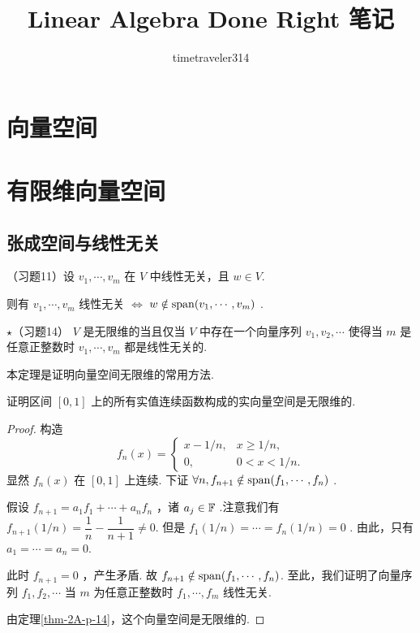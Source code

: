 \documentclass[cn,hazy,blue,14pt,screen]{elegantnote}
\title{Linear Algebra Done Right 笔记}
\author{timetraveler314}
\institute{PigeonCrowd}
\date{\zhtoday}
\begin{document}
\maketitle

\section{向量空间}

\section{有限维向量空间}

\subsection{张成空间与线性无关}

\begin{theorem}
    \label{thm-2A-p-11}
    （习题11）设 $v_1, \cdots , v_m$ 在 $V$ 中线性无关，且 $w\in V$.

    则有 $v_1,\cdots,v_m$ 线性无关 $\iff$ $w\notin \operatorname{span}(v_1,\cdots,v_m)$ .
\end{theorem}

\begin{theorem}
    \label{thm-2A-p-14}
    $\star$（习题14） $V$ 是无限维的当且仅当 $V$ 中存在一个向量序列 $v_1,v_2,\cdots$ 使得当 $m$ 是任意正整数时 $v_1,\cdots, v_m$ 都是线性无关的.
\end{theorem}

\begin{note}
    本定理是证明向量空间无限维的常用方法.
\end{note}

\Sep

\begin{problem}
    证明区间 $[0,1]$ 上的所有实值连续函数构成的实向量空间是无限维的.
\end{problem}

\begin{proof}
    构造 
    $$
    f_n(x)=\left\{ 
        \begin{array}{ll}
            x-1/n, & x\geqslant 1/n , \\
            0, & 0 < x < 1/n.
        \end{array} \right.
    $$
    显然 $f_n(x)$ 在 $[0,1]$ 上连续. 下证 $\forall n, f_{n+1} \notin \operatorname{span} (f_1,\cdots, f_n)$ . 

    假设 $f_{n+1} = a_1f_1 + \cdots + a_nf_n$ ，诸 $a_j \in \mathbb{F}$ .注意我们有 $f_{n+1}\left(1/n\right) = \dfrac{1}{n} - \dfrac{1}{n+1} \neq 0$.
    但是 $f_1(1/n) = \cdots = f_n(1/n) = 0$ . 由此，只有 $a_1 = \cdots = a_n = 0$.

    此时 $f_{n+1} = 0$ ，产生矛盾. 故 $f_{n+1} \notin \operatorname{span} (f_1,\cdots,f_n)$. 至此，我们证明了向量序列 $f_1,f_2,\cdots$ 当 $m$ 为任意正整数时 $f_1,\cdots,f_m$ 线性无关.

    由定理\ref{thm-2A-p-14}，这个向量空间是无限维的.
\end{proof}
\end{document}
